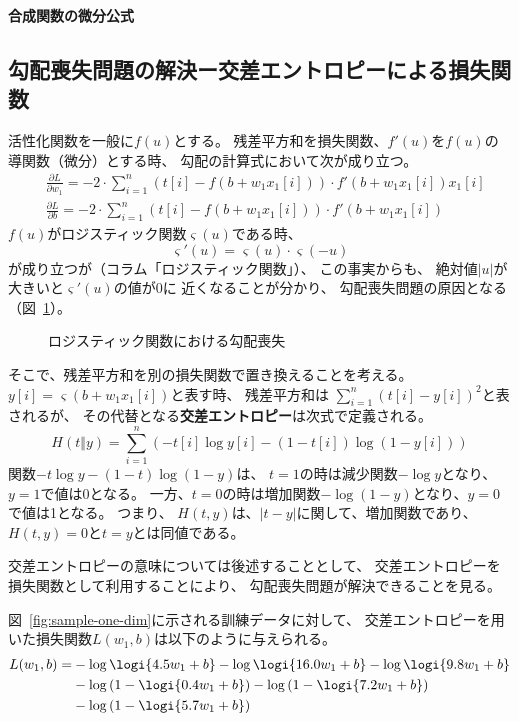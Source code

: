 \begin{itembox}{\bf 合成関数の微分公式}
  
\end{itembox}

\subsection{勾配喪失問題の解決ー交差エントロピーによる損失関数}
\label{sec:activate-function}

活性化関数を一般に$f(u)$とする。
残差平方和を損失関数、$f'(u)$を$f(u)$の導関数（微分）とする時、
勾配の計算式において次が成り立つ。
\begin{align*}
  &
    \frac{\partial L}{\partial w_1}
    = -2\cdot \sum_{i=1}^n \left(t[i] - f(b + w_1 x_1[i])\right)\cdot f'(b + w_1 x_1[i]) x_1[i]
  \\&
    \frac{\partial L}{\partial b}
  = -2\cdot \sum_{i=1}^n \left(t[i] - f(b + w_1 x_1[i])\right)\cdot f'(b + w_1 x_1[i])
\end{align*}
$f(u)$がロジスティック関数$\varsigma(u)$である時、
\[
  \varsigma'(u) = \varsigma(u) \cdot \varsigma(-u)
\]
が成り立つが（コラム「ロジスティック関数」）、
この事実からも、
絶対値$\left\vert u\right\vert$が大きいと$\varsigma'(u)$の値が0に
近くなることが分かり、
勾配喪失問題の原因となる（図~\ref{fig:grad-loss-logistic-function}）。

\begin{figure}
  \centering
  
  \caption{ロジスティック関数における勾配喪失}
  \label{fig:grad-loss-logistic-function}
\end{figure}

そこで、残差平方和を別の損失関数で置き換えることを考える。
$y[i] = \varsigma(b + w_1 x_1[i])$と表す時、
残差平方和は
$\displaystyle \sum_{i=1}^n \left(t[i] - y[i]\right)^2$と表されるが、
その代替となる\textbf{交差エントロピー}は次式で定義される。
\[
  H(t \Vert y) = \sum_{i=1}^n \left( - t[i] \log y[i]
    - (1 - t[i])\log (1 - y[i])\right)
\]
関数$- t \log y - (1 - t) \log (1 - y)$は、
$t = 1$の時は減少関数$- \log y$となり、$y = 1$で値は0となる。
一方、$t = 0$の時は増加関数$- \log (1 - y)$となり、$y = 0$で値は1となる。
つまり、
$H(t, y)$は、$\vert t - y\vert$に関して、増加関数であり、
$H(t, y) = 0$と$t = y$とは同値である。

交差エントロピーの意味については後述することとして、
交差エントロピーを損失関数として利用することにより、
勾配喪失問題が解決できることを見る。

図~\ref{fig:sample-one-dim}に示される訓練データに対して、
交差エントロピーを用いた損失関数$L(w_1, b)$は以下のように与えられる。
\begin{align}
  L(w_1, b) =
  &\nonumber
    - \log\logi{4.5 w_1 + b}  - \log\logi{16.0 w_1 + b}
    - \log\logi{9.8 w_1 + b}
  \\&\nonumber
  - \log\left(1 - \logi{0.4 w_1 + b}\right)
  - \log\left(1 - \logi{7.2 w_1 + b}\right)
  \\&\label{eq:16}
  - \log\left(1 - \logi{5.7 w_1 + b}\right)
\end{align}

